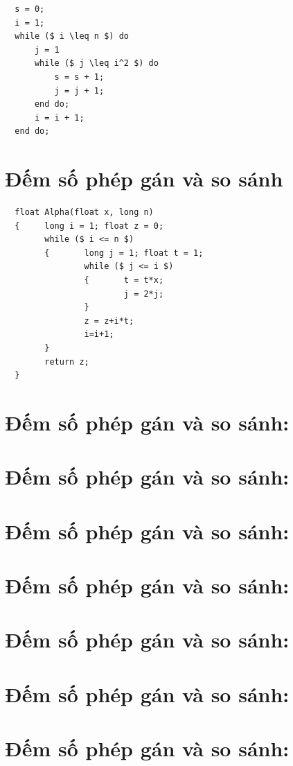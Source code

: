 \documentclass[12pt, letterpaper]{article}
\begin{document}
\begin{lstlisting}
  s = 0;
  i = 1;
  while ($ i \leq n $) do
      j = 1
      while ($ j \leq i^2 $) do
          s = s + 1;
          j = j + 1;
      end do;
      i = i + 1;
  end do;
  \end{lstlisting}

\section{Đếm số phép gán và so sánh}

\begin{lstlisting}
  float Alpha(float x, long n)
  {     long i = 1; float z = 0;
        while ($ i <= n $)
        {       long j = 1; float t = 1;
                while ($ j <= i $)
                {       t = t*x;
                        j = 2*j;
                }
                z = z+i*t;
                i=i+1;
        }
        return z;
  }
\end{lstlisting}

  \section{Đếm số phép gán và so sánh:}
  \section{Đếm số phép gán và so sánh:}
  \section{Đếm số phép gán và so sánh:}
  \section{Đếm số phép gán và so sánh:}
  \section{Đếm số phép gán và so sánh:}
  \section{Đếm số phép gán và so sánh:}
  \section{Đếm số phép gán và so sánh:}
  
\end{document}
